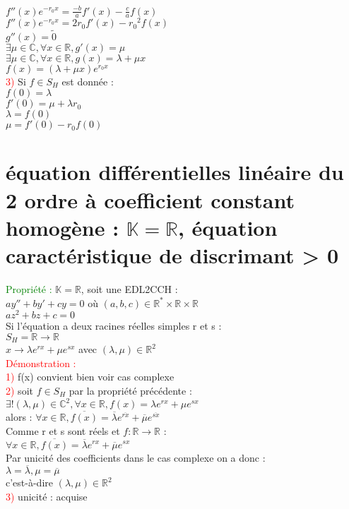 \documentclass{article}
\begin{document}
	$f''(x)e^{-r_0x}= \frac{-b}{a}f'(x)-\frac{c}{a}f(x)$\\ 
	$f''(x)e^{-r_0x}=2r_0 f'(x)-{r_0}^2f(x)$ \\ 
	$g''(x)=\tilde 0$ \\ 
	$\exists \mu \in \mathbb{C}, \forall x \in \mathbb{R}, g'(x)=\mu$ \\ 
	$\exists \mu \in \mathbb{C}, \forall x \in \mathbb{R}, g(x)=\lambda +\mu x$ \\ 
	$f(x)=(\lambda + \mu x)e^{r_0x}$ \\ 
	\textcolor{red}{3)} Si $f \in S_H$ est donnée : \\ 
	$f(0)=\lambda$ \\ 
	$f'(0)=\mu +\lambda r_0$ \\ 
	$\lambda = f(0)$ \\ 
	$\mu =f'(0)-r_0f(0)$
	\section{équation différentielles linéaire du 2 ordre à coefficient constant homogène : $\mathbb{K} = \mathbb{R}$, équation caractéristique de discrimant > 0 }
	\textcolor{green}{Propriété :} $\mathbb{K} =\mathbb{R}$, soit une EDL2CCH : \\ 
	$ay''+by'+cy=0$ où $(a,b,c)\in \mathbb{R}^* \times \mathbb{R} \times \mathbb{R}$ \\ 
	$az^2+bz+c=0$ \\ 
	Si l'équation a deux racines réelles simples r et s : \\ 
	$S_H= \mathbb{R} \rightarrow \mathbb{R}$ \\ 
	$x \rightarrow \lambda e^{rx}+\mu e^{sx}$ avec $(\lambda , \mu) \in \mathbb{R}^2$ \\ 
	\textcolor{red}{Démonstration :} \\ 
	\textcolor{red}{1)} f(x) convient bien voir cas complexe \\ 
	\textcolor{red}{2)} soit $f \in S_H$ par la propriété précédente : \\ 
	$\exists ! (\lambda,\mu)\in \mathbb{C}^2,\forall x \in \mathbb{R},f(x)= \lambda e^{rx}+ \mu e^{sx}$ \\ 
	alors : $\forall x \in \mathbb{R}, \overline{f(x)}=\overline{\lambda}e^{\overline{rx}}+\overline{\mu} e^{\overline{sx}}$ \\ 
	Comme r et s sont réels et $f: \mathbb{R}\rightarrow \mathbb{R}$ : \\ 
	$\forall x \in \mathbb{R}, \overline{f(x)}=\overline{\lambda}e^{rx}+ \overline{\mu} e^{sx}$ \\ 
	Par unicité des coefficients dans le cas complexe on a donc : \\ 
	$\lambda=\overline{\lambda}, \mu =\overline{\mu}$ \\ 
	c'est-à-dire $(\lambda , \mu ) \in \mathbb{R}^2$ \\ 
	\textcolor{red}{3)} unicité : acquise
\end{document}
